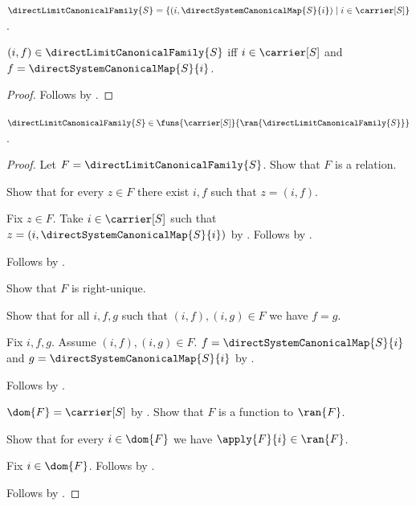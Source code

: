 \begin{definition}\label{direct_limit_canonical_family}
    $\directLimitCanonicalFamily{S}=
        \{(i,\directSystemCanonicalMap{S}{i})
            \mid i\in\carrier[S]\}$.
\end{definition}

\begin{proposition}\label{direct_limit_canonical_family_iff}
    $(i,f)\in\directLimitCanonicalFamily{S}$ iff
        $i\in\carrier[S]$ and
        $f=\directSystemCanonicalMap{S}{i}$.
\end{proposition}
\begin{proof}
    Follows by
        .
\end{proof}

\begin{proposition}\label{direct_limit_canonical_family_type}
    $\directLimitCanonicalFamily{S}\in
        \funs{\carrier[S]}{\ran{\directLimitCanonicalFamily{S}}}$.
\end{proposition}
\begin{proof}
    Let $F=\directLimitCanonicalFamily{S}$.
    Show that $F$ is a relation.
    \begin{subproof}
        Show that for every $z\in F$ there exist $i,f$ such that
            $z=(i,f)$.
        \begin{subproof}
            Fix $z\in F$.
            Take $i\in\carrier[S]$ such that
                $z=(i,\directSystemCanonicalMap{S}{i})$ by
                .
            Follows by \auto.
        \end{subproof}
        Follows by .
    \end{subproof}
    Show that $F$ is right-unique.
    \begin{subproof}
        Show that for all $i,f,g$ such that $(i,f),(i,g)\in F$
            we have $f=g$.
        \begin{subproof}
            Fix $i,f,g$.
            Assume $(i,f),(i,g)\in F$.
            $f=\directSystemCanonicalMap{S}{i}$ and
                $g=\directSystemCanonicalMap{S}{i}$ by
                .
        \end{subproof}
        Follows by .
    \end{subproof}
    $\dom{F}=\carrier[S]$ by
        .
    Show that $F$ is a function to $\ran{F}$.
    \begin{subproof}
        Show that for every $i\in\dom{F}$ we have
            $\apply{F}{i}\in\ran{F}$.
        \begin{subproof}
            Fix $i\in\dom{F}$.
            Follows by .
        \end{subproof}
    \end{subproof}
    Follows by .
\end{proof}

